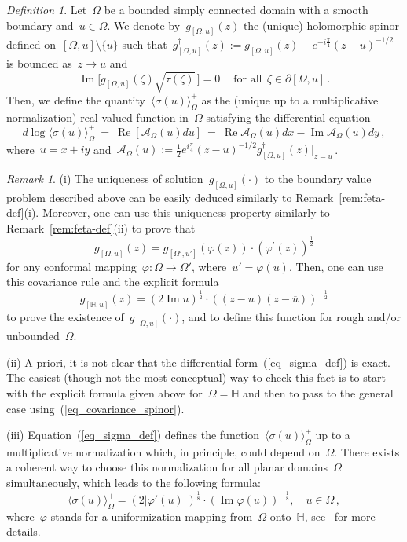 \documentclass[reqno,11pt,a4paper]{amsart}
\theoremstyle{remark}
\newtheorem{definition}[proposition]{Definition}
\newtheorem{remark}[proposition]{Remark}
\renewcommand{\H}{\mathbb{H}}
\newcommand{\OmegaU}{{[\Omega,u]}}
\newcommand{\OmegaUprime}{{[\Omega',u']}}
\newcommand{\spinor}{g_\OmegaU}
\newcommand{\spinorReg}{\spinor^\dag}
\newcommand{\spinorprime}{g_\OmegaUprime}
\renewcommand\Re{\operatorname{Re}}
\renewcommand\Im{\operatorname{Im}}
\newcommand\Corr[1]{\langle #1 \rangle}
\newcommand\CorrO[2][+]{\Corr{#2}_\Omega^{#1}}
\begin{document}
\begin{definition}
\label{def:spinor} Let~$\Omega$ be a bounded simply connected domain with a smooth boundary and~$u\in\Omega$. We denote by~$\spinor(z)$  the (unique) holomorphic spinor defined on~$\OmegaU\setminus\{u\}$ such that~$\spinorReg(z):=\spinor(z)-e^{-i\frac{\pi}{4}}(z-u)^{-1/2}$ is bounded as~$z\to u$ and
\[
\Im\big[\spinor(\zeta)\sqrt{\tau(\zeta)}\,\big]=0~\quad\text{for~all}\ \ \zeta\in\partial \OmegaU\,.
\]
Then, we define the quantity~$\CorrO{\sigma(u)}$ as the (unique up to a multiplicative normalization) real-valued function in~$\Omega$ satisfying the differential equation
\begin{equation}
\label{eq_sigma_def}
d\log\CorrO{\sigma(u)}~=~\Re[\mathcal{A}_\Omega(u)du]~=~\Re{\mathcal{A}_\Omega(u)}dx-\Im\mathcal{A}_\Omega(u)dy\,,
\end{equation}
where~$u=x+iy$ and~$\mathcal{A}_\Omega(u):=\tfrac{1}{2}e^{i\frac{\pi}{4}}(z-u)^{-1/2}\spinorReg(z)\big|_{z=u}$\,.
\end{definition}
\begin{remark} (i) The uniqueness of solution~$\spinor(\cdot)$ to the boundary value problem described above can be easily deduced similarly to Remark~\ref{rem:feta-def}(i). Moreover, one can use this uniqueness property similarly to Remark~\ref{rem:feta-def}(ii) to prove that
\begin{equation}\label{eq_covariance_spinor}
\spinor(z) = \spinorprime(\varphi(z))\cdot (\varphi^\prime(z))^\frac{1}{2}
\end{equation}
for any conformal mapping~$\varphi:\Omega\to\Omega'$, where~$u'=\varphi(u)$. Then, one can use this covariance rule and the explicit formula
\[
g_{[\H,u]}(z)=(2\Im u)^{\frac{1}{2}}\cdot ((z-u)(z-\overline{u}))^{-\frac{1}{2}}
\]
to prove the existence of~$\spinor(\cdot)$, and to define this function for rough and/or unbounded~$\Omega$.

\noindent (ii) A priori, it is not clear that the differential form~(\ref{eq_sigma_def}) is exact. The easiest (though not the most conceptual) way to check this fact is to start with the explicit formula given above for~$\Omega=\H$ and then to pass to the general case using~(\ref{eq_covariance_spinor}).

\noindent (iii) Equation~(\ref{eq_sigma_def}) defines the function~$\CorrO{\sigma(u)}$ up to a multiplicative normalization which, in principle, could depend on~$\Omega$. There exists a coherent way to choose this normalization for all planar domains~$\Omega$ simultaneously, which leads to the following formula:
\begin{equation}
\label{eq_spin-explicit}
\CorrO{\sigma(u)}= (2|\varphi'(u)|)^{\frac{1}{8}}\cdot (\Im\varphi(u))^{-\frac{1}{8}},\quad u\in\Omega\,,
\end{equation}
where~$\varphi$ stands for a uniformization mapping from~$\Omega$ onto~$\H$, see~\cite{CheHonIzy15} for more details.
\end{remark}
\end{document}

